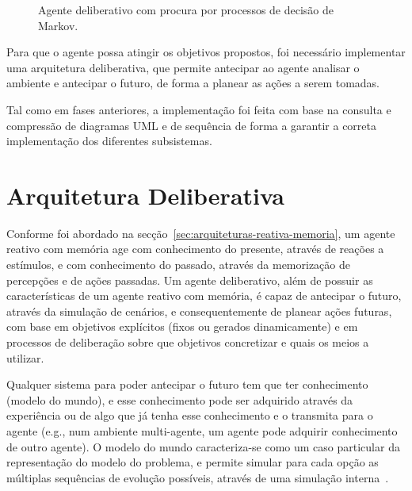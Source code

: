 \begin{figure}[H]
    \begin{center}
    \end{center}
    \caption{Agente deliberativo com procura por processos de decisão de Markov.}
    \label{fig:agente-delib-pdm}
\end{figure}

Para que o agente possa atingir os objetivos propostos, foi necessário implementar uma arquitetura deliberativa, que permite antecipar ao agente analisar o ambiente e antecipar o futuro, de forma a planear as ações a serem tomadas.

Tal como em fases anteriores, a implementação foi feita com base na consulta e compressão de diagramas UML e de sequência de forma a garantir a correta implementação dos diferentes subsistemas.


\section{Arquitetura Deliberativa}\label{sec:arquitetura-deliberativa}

Conforme foi abordado na secção~\ref{sec:arquiteturas-reativa-memoria}, um agente reativo com memória age com conhecimento do presente, através de reações a estímulos, e com conhecimento do passado, através da memorização de percepções e de ações passadas.
Um agente deliberativo, além de possuir as características de um agente reativo com memória, é capaz de antecipar o futuro, através da simulação de cenários, e consequentemente de planear ações futuras, com base em objetivos explícitos (fixos ou gerados dinamicamente) e em processos de deliberação sobre que objetivos concretizar e quais os meios a utilizar.

Qualquer sistema para poder antecipar o futuro tem que ter conhecimento (modelo do mundo), e esse conhecimento pode ser adquirido através da experiência ou de algo que já tenha esse conhecimento e o transmita para o agente (e.g., num ambiente multi-agente, um agente pode adquirir conhecimento de outro agente).
O modelo do mundo caracteriza-se como um caso particular da representação do modelo do problema, e permite simular para cada opção as múltiplas sequências de evolução possíveis, através de uma simulação interna~\cite{isel:iasa:slides:arq-agentes-deliberativos}.

